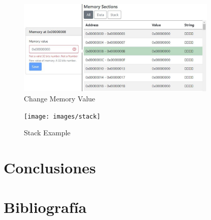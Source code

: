 {{            \begin{figure}[h]
                \centering
                \includegraphics[width=0.85\textwidth]{images/modifymemory}
                \caption{Change Memory Value}
            \end{figure}

            \begin{figure}[h]
                \centering
                \texttt{[image: images/stack]}
                \caption{Stack Example}
            \end{figure}            
        }
    }

\section{Conclusiones}
{
}

\section{Bibliografía}
{
}

